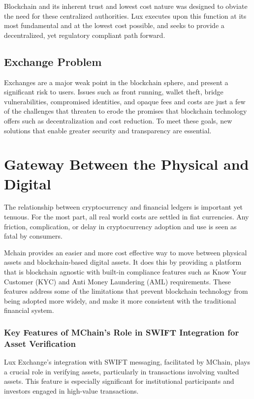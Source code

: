 \documentclass[11pt]{article}
\begin{document}
Blockchain and its inherent trust and lowest cost nature was designed to obviate the need for these centralized authorities. Lux executes upon this function at its most fundamental and at the lowest cost possible, and seeks to provide a decentralized, yet regulatory compliant path forward.


\subsection{Exchange Problem}

Exchanges are a major weak point in the blockchain sphere, and present a significant risk to users. Issues such as front running, wallet theft, bridge vulnerabilities, compromised identities, and opaque fees and costs are just a few of the challenges that threaten to erode the promises that blockchain technology offers such as decentralization and cost reduction. To meet these goals, new solutions that enable greater security and transparency are essential.


\section{Gateway Between the Physical and Digital}

The relationship between cryptocurrency and financial ledgers is important yet tenuous. For the most part, all real world costs are settled in fiat currencies. Any friction, complication, or delay in cryptocurrency adoption and use is seen as fatal by consumers.


Mchain provides an easier and more cost effective way to move between physical assets and blockchain-based digital assets. It does this by providing a platform that is blockchain agnostic with built-in compliance features such as Know Your Customer (KYC) and Anti Money Laundering (AML) requirements. These features address some of the limitations that prevent blockchain technology from being adopted more widely, and make it more consistent with the traditional financial system.


\subsubsection{Key Features of MChain's Role in SWIFT Integration for Asset Verification}

Lux Exchange's integration with SWIFT messaging, facilitated by MChain, plays a crucial role in verifying assets, particularly in transactions involving vaulted assets. This feature is especially significant for institutional participants and investors engaged in high-value transactions.
\end{document}
